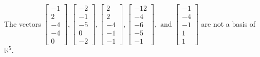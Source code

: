 \begin{exercise}
\begin{exerciseStatement}
  \end{exerciseStatement}
  \begin{exerciseAnswer}
   The vectors \(\left[\begin{array}{r}
-1 \\
2 \\
-4 \\
-4 \\
0
\end{array}\right] , \left[\begin{array}{r}
-2 \\
-1 \\
-5 \\
0 \\
-2
\end{array}\right] , \left[\begin{array}{r}
2 \\
2 \\
-4 \\
-1 \\
-1
\end{array}\right] , \left[\begin{array}{r}
-12 \\
-4 \\
-6 \\
-5 \\
-1
\end{array}\right] , \text{ and } \left[\begin{array}{r}
-1 \\
-4 \\
-1 \\
1 \\
1
\end{array}\right]\) 
  	 are not  a basis of \(\mathbb{R}^5\).
  


  \end{exerciseAnswer}
\end{exercise}